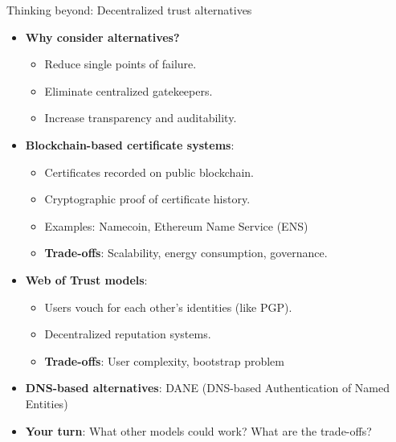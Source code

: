 \documentclass[aspectratio=169, lualatex, handout]{beamer}
\begin{document}
\begin{frame}{Thinking beyond: Decentralized trust alternatives}
	\begin{itemize}
		\item \textbf{Why consider alternatives?}
		      \begin{itemize}
			      \item Reduce single points of failure.
			      \item Eliminate centralized gatekeepers.
			      \item Increase transparency and auditability.
		      \end{itemize}
		\item \textbf{Blockchain-based certificate systems}:
		      \begin{itemize}
			      \item Certificates recorded on public blockchain.
			      \item Cryptographic proof of certificate history.
			      \item Examples: Namecoin, Ethereum Name Service (ENS)
			      \item \textbf{Trade-offs}: Scalability, energy consumption, governance.
		      \end{itemize}
		\item \textbf{Web of Trust models}:
		      \begin{itemize}
			      \item Users vouch for each other's identities (like PGP).
			      \item Decentralized reputation systems.
			      \item \textbf{Trade-offs}: User complexity, bootstrap problem
		      \end{itemize}
		\item \textbf{DNS-based alternatives}: DANE (DNS-based Authentication of Named Entities)
		\item \textbf{Your turn}: What other models could work? What are the trade-offs?
	\end{itemize}
\end{frame}
\end{document}
